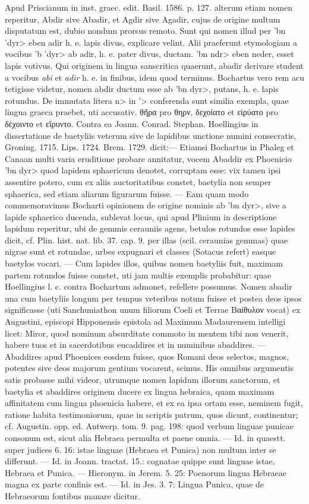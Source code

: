 \documentclass[a4paper, 11pt, oneside, polutonikogreek, german]{article}
\begin{document}
Apud Priscianum in inst. graec. edit. Basil. 1586. p. 127. alterum etiam nomen reperitur, Abdir sive Abadir, et Agdir sive Agadir, cujus de origine multum disputatum est, dubio nondum prorsus remoto. Sunt qui nomen illud per \<'bn 'dyr> eben adir h. e. lapis divus, explicare velint. Alii praeferunt etymologiam a vocibus \<'b 'dyr> ab adir, h. e. pater divus, ductam. \<'bn ndr> eben neder, esset lapis votivus. Qui originem in lingua sanscritica quaerunt, abadir derivare student a vocibus \emph{abi} et \emph{adir} h. e. in finibus, idem quod terminus. Bochartus vero rem acu tetigisse videtur, nomen abdir ductum esse ab \<'bn dyr>, putans, h. e. lapis rotundus. De immutata litera \<n> in \<'> conferenda sunt similia exempla, quae lingua graeca praebet, uti accusativ. θῆρα pro θηρν, δεχοίατο et εἰρύατο pro δέχοιντο et εἴρυντο. Contra ea Joann. Conrad. Stephan. Hoellingius in dissertatione de baetyliis veterum sive de lapidibus unctione numini consecratis, Groning. 1715. Lips. 1724. Brem. 1729. dicit:--- Etiamsi Bochartus in Phaleg et Canaan multi varia eruditione probare annitatur, vocem Abaddir ex Phoenicio \<'bn dyr> quod lapidem sphaericum denotet, corruptam esse: vix tamen ipsi assentire potero, cum ex aliis auctoritatibus constet, baetylia non semper sphaerica, sed etiam aliarum figurarum fuisse. --- Eam quam modo commemoravimus Bocharti opinionem de origine nominis ab \<'bn dyr>, sive a lapide sphaerico ducenda, sublevat locus, qui apud Plinium in descriptione lapidum reperitur, ubi de gemmis cerauniis agens, betulos rotundos esse lapides dicit, cf. Plin. hist. nat. lib. 37. cap. 9. per illas (scil. ceraunias gemmas) quae nigrae sunt et rotundae, urbes expugnari et classes (Sotacus refert) easque baetylos vocari. --- Cum lapides illos, quibus nomen baetyliis fuit, maximam partem rotundos fuisse constet, uti jam multis exemplis probabitur: quae Hoellingius l. c. contra Bochartum admonet, refellere possumus. Nomen abadir una cum baetyliis longum per tempus veteribus notum fuisse et postea deos ipsos significasse (uti Sanchuniathon unum filiorum Coeli et Terrae Βαίθυλον vocat) ex Augustini, episcopi Hipponensis epistola ad Maximum Madaurensem intelligi licet: Miror, quod nominum absurditate commoto in mentem tibi non venerit, habere tuos et in sacerdotibus eucaddires et in numinibus abaddires. --- Abaddires apud Phoenices eosdem fuisse, quos Romani deos selectos, magnos, potentes sive deos majorum gentium vocarent, scimus. His omnibus argumentis satis probasse mihi videor, utrumque nomen lapidum illorum sanctorum, et baetylia et abaddires originem ducere ex lingua hebraica, quam maximam affinitatem cum lingua phoenicia habere, et ex ea ipsa ortam esse, neminem fugit, ratione habita testimoniorum, quae in scriptis patrum, quos dicunt, continentur; cf. Augustin. opp. ed. Antwerp. tom. 9. pag. 198: quod verbum linguae punicae consonum est, sicut alia Hebraea permulta et paene omnia. --- Id. in quaestt. super judices 6. 16: istae linguae (Hebraea et Punica) non multum inter se differunt. --- Id. in Joann. tractat. 15.: cognatae quippe sunt linguae istae, Hebraea et Punica. --- Hieronym. in Jerem. 5. 25: Poenorum lingua Hebraeae magna ex parte confinis est. --- Id. in Jes. 3. 7: Lingua Punica, quae de Hebraeorum fontibus manare dicitur.
\end{document}
